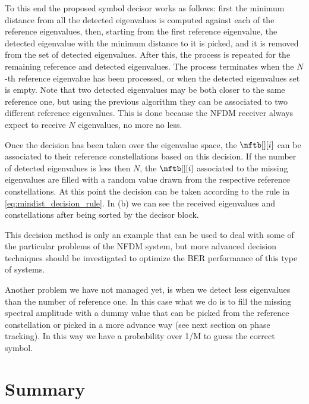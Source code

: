 To this end the proposed symbol decisor works as follows:
first the minimum distance from all the detected eigenvalues is computed against
each of the reference eigenvalues, then, starting from the first reference
eigenvalue, the detected eigenvalue with the minimum distance to it is picked, and
it is removed from the set of detected eigenvalues. After this, the process is repeated for the remaining reference and detected eigenvalues. The process terminates when the $N$-th reference eigenvalue has been processed, or when the detected eigenvalues set is empty. Note that two
detected eigenvalues may be both closer to the same reference one, but using the
previous algorithm they can be associated to two different reference
eigenvalues. This is done because the \ac{NFDM} receiver always expect to receive $N$
eigenvalues, no more no less.

Once the decision has been taken over the eigenvalue space, the $\nftb[][i]$ can be associated to their reference constellations based on this decision. If the number of detected eigenvalues is less then $N$, the $\nftb[][i]$ associated to the missing eigenvalues are filled with a random value drawn from the respective reference constellations. At this point the decision can be taken according to the rule in \eqref{eq:mindist_decision_rule}.
In (b) we can see the received eigenvalues and constellations after being sorted by the decisor block.

This decision method is only an example that can be used to deal with some of the particular problems of the \ac{NFDM} system, but more advanced decision techniques should be investigated to optimize the \ac{BER} performance of this type of systems.

\begin{extendedthesis}
 Another problem we have not managed yet, is when we detect less eigenvalues
than the number of reference one. In this case what we do is to fill the missing
spectral amplitude with a dummy value that can be picked from the reference
constellation or picked in a more advance way (see next section on phase
tracking). In this way we have a probability over 1/M to guess the correct
symbol.
\end{extendedthesis}

\section{Summary}

